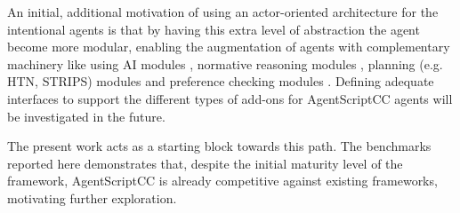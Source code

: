 An initial, additional motivation of using an actor-oriented architecture for the intentional agents is that by having this extra level of abstraction the agent become more modular, enabling the augmentation of agents with complementary machinery like using AI modules \cite{Singh2011IntegratingLI}, normative reasoning modules \cite{meneguzzi2009norm}, planning (e.g. HTN, STRIPS) modules \cite{meneguzzi_de_silva_2015} and preference checking modules \cite{Visser2016,Mohajeri2019}. Defining  adequate interfaces to support the different types of add-ons for AgentScriptCC agents will be investigated in the future.

The present work acts as a starting block towards this path. The benchmarks reported here demonstrates that, despite the initial maturity level of the framework, AgentScriptCC is already competitive against existing frameworks, motivating further exploration.


 
